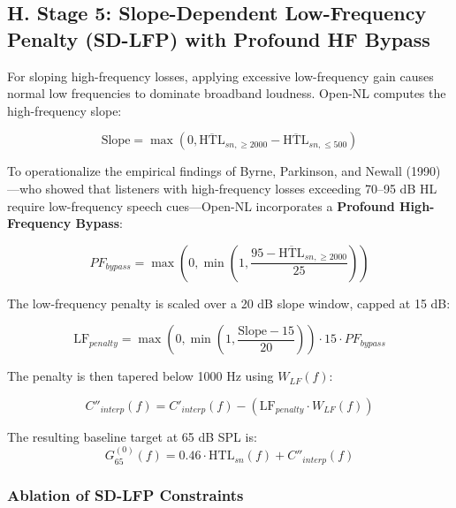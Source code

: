 \documentclass[
]{article}
\begin{document}
\subsection{H. Stage 5: Slope-Dependent Low-Frequency Penalty (SD-LFP)
with Profound HF
Bypass}\label{h.-stage-5-slope-dependent-low-frequency-penalty-sd-lfp-with-profound-hf-bypass}

For sloping high-frequency losses, applying excessive low-frequency gain
causes normal low frequencies to dominate broadband loudness. Open-NL
computes the high-frequency slope:

\begin{equation}
\text{Slope} = \max\left(0, \overline{\text{HTL}}_{sn, \ge 2000} - \overline{\text{HTL}}_{sn, \le 500}\right)
\end{equation}

To operationalize the empirical findings of Byrne, Parkinson, and Newall
(1990)---who showed that listeners with high-frequency losses exceeding
70--95 dB HL require low-frequency speech cues---Open-NL incorporates a
\textbf{Profound High-Frequency Bypass}:

\begin{equation}
PF_{bypass} = \max\left(0, \min\left(1, \frac{95 - \overline{\text{HTL}}_{sn, \ge 2000}}{25}\right)\right)
\end{equation}

The low-frequency penalty is scaled over a 20 dB slope window, capped at
15 dB:

\begin{equation}
\text{LF}_{penalty} = \max\left(0, \min\left(1, \frac{\text{Slope} - 15}{20}\right)\right) \cdot 15 \cdot PF_{bypass}
\end{equation}

The penalty is then tapered below 1000 Hz using \(W_{LF}(f)\):

\begin{equation}
C''_{interp}(f) = C'_{interp}(f) - \left(\text{LF}_{penalty} \cdot W_{LF}(f)\right)
\end{equation}

The resulting baseline target at 65 dB SPL is: \begin{equation}
G_{65}^{(0)}(f) = 0.46 \cdot \text{HTL}_{sn}(f) + C''_{interp}(f)
\end{equation}

\subsubsection{Ablation of SD-LFP
Constraints}\label{ablation-of-sd-lfp-constraints}
\end{document}
